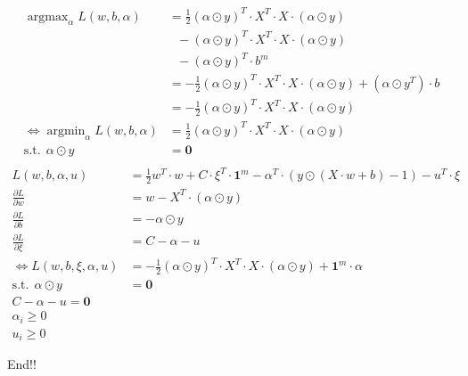 \documentclass[12pt, a4paper, oneside]{ctexart}
\begin{document}
\begin{align}
    \mathop{\arg\max}_{\alpha} L(w, b, {\alpha}) &= \frac{1}{2}(\alpha \odot y)^T \cdot X^T \cdot X \cdot (\alpha \odot y) \nonumber \\
                      & \ \ \  - (\alpha \odot y)^T \cdot X^T \cdot X \cdot (\alpha \odot y) \nonumber \\
                      & \ \ \  - (\alpha \odot y)^T \cdot b^m  \nonumber \\
                      &= -\frac{1}{2}(\alpha \odot y)^T \cdot X^T \cdot X \cdot (\alpha \odot y) + (\alpha \odot y^T) \cdot b \nonumber \\
                      &= -\frac{1}{2}(\alpha \odot y)^T \cdot X^T \cdot X \cdot (\alpha \odot y) \nonumber \\
    \iff \mathop{\arg\min}_{\alpha} L(w, b, {\alpha}) &= \frac{1}{2}(\alpha \odot y)^T \cdot X^T \cdot X \cdot (\alpha \odot y) \nonumber \\
        \mathrm{ s.t. }\ \   \alpha \odot y &= \boldsymbol{0} \nonumber \\
\end{align}
\begin{align}
    L(w, b, {\alpha}, u) &= \frac{1}{2}w^T \cdot w + C \cdot \xi^T \cdot\boldsymbol{1}^m   - {\alpha} ^T \cdot  (y \odot (X \cdot w + b) - 1) - u^T \cdot \xi \nonumber \\
    \frac{\partial L}{\partial w} &= w - X^T\cdot(\alpha \odot y) \nonumber \\
    \frac{\partial L}{\partial b} &= - \alpha \odot y \nonumber  \\
    \frac{\partial L}{\partial \xi} &= C - \alpha - u \nonumber \\
    \iff  L(w, b, \xi, {\alpha}, u) &= -\frac{1}{2}(\alpha \odot y)^T \cdot X^T \cdot X \cdot (\alpha \odot y) + \boldsymbol{1}^m \cdot \alpha \nonumber \\
    \mathrm{ s.t. }\ \   \alpha \odot y &= \boldsymbol{0} \nonumber \\
    C - \alpha - u \nonumber  = \boldsymbol{0} \nonumber \\
    \alpha_i \geq 0 \nonumber \\
    u_i \geq 0 \nonumber 
\end{align}

End!!
\end{document}
